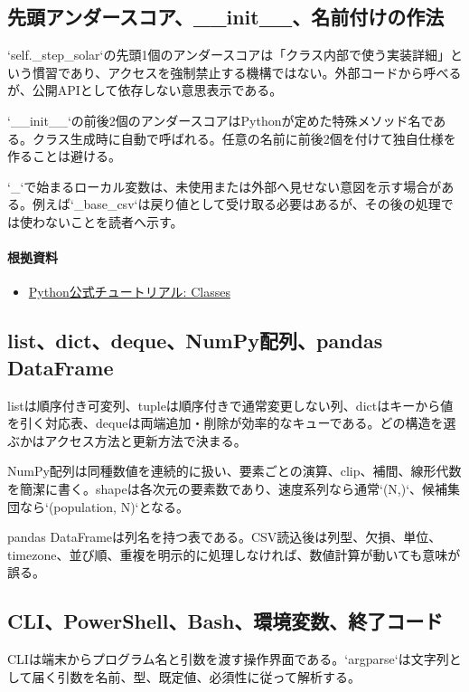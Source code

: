 \documentclass[a4paper,11pt]{article}
\begin{document}
\subsection{先頭アンダースコア、\_\_init\_\_、名前付けの作法}
`self.\_step\_solar`の先頭1個のアンダースコアは「クラス内部で使う実装詳細」という慣習であり、アクセスを強制禁止する機構ではない。外部コードから呼べるが、公開APIとして依存しない意思表示である。


`\_\_init\_\_`の前後2個のアンダースコアはPythonが定めた特殊メソッド名である。クラス生成時に自動で呼ばれる。任意の名前に前後2個を付けて独自仕様を作ることは避ける。


`\_`で始まるローカル変数は、未使用または外部へ見せない意図を示す場合がある。例えば`\_base\_csv`は戻り値として受け取る必要はあるが、その後の処理では使わないことを読者へ示す。

\paragraph{根拠資料}
\begin{itemize}[leftmargin=1.6em]
\item \href{https://docs.python.org/3/tutorial/classes.html}{Python公式チュートリアル: Classes}
\end{itemize}

\subsection{list、dict、deque、NumPy配列、pandas DataFrame}
listは順序付き可変列、tupleは順序付きで通常変更しない列、dictはキーから値を引く対応表、dequeは両端追加・削除が効率的なキューである。どの構造を選ぶかはアクセス方法と更新方法で決まる。


NumPy配列は同種数値を連続的に扱い、要素ごとの演算、clip、補間、線形代数を簡潔に書く。shapeは各次元の要素数であり、速度系列なら通常`(N,)`、候補集団なら`(population, N)`となる。


pandas DataFrameは列名を持つ表である。CSV読込後は列型、欠損、単位、timezone、並び順、重複を明示的に処理しなければ、数値計算が動いても意味が誤る。



\subsection{CLI、PowerShell、Bash、環境変数、終了コード}
CLIは端末からプログラム名と引数を渡す操作界面である。`argparse`は文字列として届く引数を名前、型、既定値、必須性に従って解析する。
\end{document}
